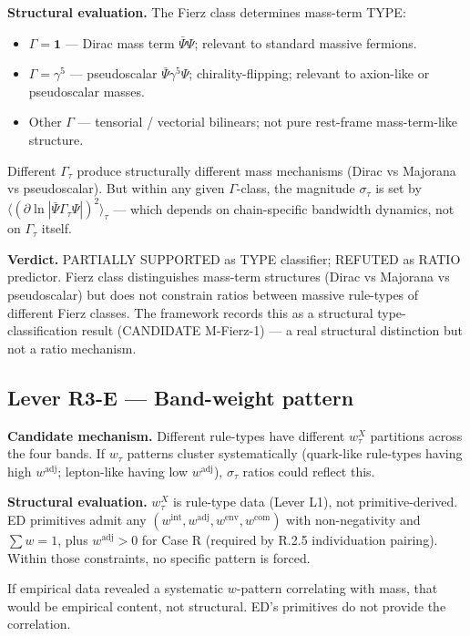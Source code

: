 \documentclass[11pt,a4paper]{article}
\begin{document}
\textbf{Structural evaluation.} The Fierz class determines mass-term TYPE:

\begin{itemize}[noitemsep]
  \item $\Gamma = \mathbf{1}$ --- Dirac mass term $\bar\Psi\Psi$; relevant to standard massive fermions.
  \item $\Gamma = \gamma^5$ --- pseudoscalar $\bar\Psi\gamma^5\Psi$; chirality-flipping; relevant to axion-like or pseudoscalar masses.
  \item Other $\Gamma$ --- tensorial / vectorial bilinears; not pure rest-frame mass-term-like structure.
\end{itemize}

Different $\Gamma_\tau$ produce structurally different mass mechanisms (Dirac vs Majorana vs pseudoscalar). But within any given $\Gamma$-class, the magnitude $\sigma_\tau$ is set by $\langle(\partial\ln|\bar\Psi\Gamma_\tau\Psi|)^2\rangle_\tau$ --- which depends on chain-specific bandwidth dynamics, not on $\Gamma_\tau$ itself.

\textbf{Verdict.} PARTIALLY SUPPORTED as TYPE classifier; REFUTED as RATIO predictor. Fierz class distinguishes mass-term structures (Dirac vs Majorana vs pseudoscalar) but does not constrain ratios between massive rule-types of different Fierz classes. The framework records this as a structural type-classification result (CANDIDATE M-Fierz-1) --- a real structural distinction but not a ratio mechanism.

\subsection{Lever R3-E --- Band-weight pattern}

\textbf{Candidate mechanism.} Different rule-types have different $w_\tau^X$ partitions across the four bands. If $w_\tau$ patterns cluster systematically (quark-like rule-types having high $w^{\mathrm{adj}}$; lepton-like having low $w^{\mathrm{adj}}$), $\sigma_\tau$ ratios could reflect this.

\textbf{Structural evaluation.} $w_\tau^X$ is rule-type data (Lever L1), not primitive-derived. ED primitives admit any $(w^{\mathrm{int}}, w^{\mathrm{adj}}, w^{\mathrm{env}}, w^{\mathrm{com}})$ with non-negativity and $\sum w = 1$, plus $w^{\mathrm{adj}} > 0$ for Case R (required by R.2.5 individuation pairing). Within those constraints, no specific pattern is forced.

If empirical data revealed a systematic $w$-pattern correlating with mass, that would be empirical content, not structural. ED's primitives do not provide the correlation.
\end{document}
